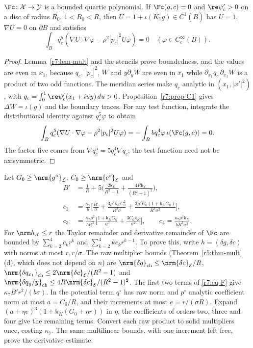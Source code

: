 \begin{lemma}\label{r7:lem-F}
$\Fc\colon\mathcal X\to\mathcal Y$ is a bounded quartic polynomial. If $\Fc(g,c)=0$ and $\re\psi'_c>0$ on a disc of radius $R_0$, $1<R_0<R$, then $U=1+\iota(K_7g)\in C^1(\overline B)$ has $U=1$, $\nabla U=0$ on $\partial B$ and satisfies
\[
\int_Bq_c^5(\nabla U\cdot\nabla\varphi-\rho^2|p_c|^2U\varphi)=0\quad(\varphi\in C_c^\infty(B)).
\]
\end{lemma}
\begin{proof}
Lemma~\ref{r7:lem-mult} and the stencils prove boundedness, and the values are even in $x_1$, because $q_c$, $|p_c|^2$, $W$ and $y\partial_yW$ are even in $x_1$ while $\partial_{x_1}q_c\,\partial_{x_1}W$ is a product of two odd functions. The meridian series make $q_c$ analytic in $(x_1,|x'|^2)$, with $q_c=\int_0^1\re\psi'_c(x_1+iuy)\,du>0$. Proposition~\ref{r7:prop-C1} gives $\Delta W=\iota(g)$ and the boundary traces. For any test function, integrate the distributional identity against $q_c^5\varphi$ to obtain
\[
\int_Bq_c^5(\nabla U\cdot\nabla\varphi-\rho^2|p_c|^2U\varphi)
=-\int_B bq_c^4\varphi\,\iota(\Fc(g,c))=0.
\]
The factor five comes from $\nabla q_c^5=5q_c^4\nabla q_c$; the test function need not be axisymmetric.
\end{proof}

Let $G_0\geq\nrm{g^\circ}_{\mathcal L}$, $C_0\geq\nrm{c^\circ}_{\mathcal E}$ and
\begin{align*}
B'&=\frac1R+5\Big(\frac{2\mathsf k_D}{R^2-1}+\frac{4R\mathsf k_Y}{(R^2-1)^2}\Big),\\
c_2&=\frac{\kappa_7}b\Big[\frac{B'}\sigma+\frac{3\rho^2\mathsf k_KC_0^2}{R^3\sigma}+\frac{3\rho^2C_0(1+\mathsf k_KG_0)}{R^3\sigma^2}\Big],\\
c_3&=\frac{\kappa_7\rho^2}{bR^3}\Big[\frac{1+\mathsf k_KG_0}{\sigma^3}+\frac{3C_0\mathsf k_K}{\sigma^2}\Big],\qquad
c_4=\frac{\kappa_7\rho^2\mathsf k_K}{bR^3\sigma^3}.
\end{align*}
For $\nrm h_{\mathcal X}\leq r$ the Taylor remainder and derivative remainder of $\Fc$ are bounded by $\sum_{k=2}^4c_kr^k$ and $\sum_{k=2}^4kc_kr^{k-1}$. To prove this, write $h=(\delta g,\delta c)$ with norms at most $r,r/\sigma$. The raw multiplier bounds (Theorem~\ref{r5:thm-mult}(d), which does not depend on $n$) are $\nrm{\delta q}_{\mathrm{ch}}\leq\nrm{\delta c}_{\mathcal E}/R$, $\nrm{\delta q_{x_1}}_{\mathrm{ch}}\leq2\nrm{\delta c}_{\mathcal E}/(R^2-1)$ and $\nrm{\delta q_y/y}_{\mathrm{ch}}\leq4R\nrm{\delta c}_{\mathcal E}/(R^2-1)^2$. The first two terms of \eqref{r7:eq-F} give $\kappa_7B'r^2/(b\sigma)$. In the potential term $q^\circ$ has raw norm and $p^\circ$ analytic coefficient norm at most $a=C_0/R$, and their increments at most $e=r/(\sigma R)$. Expand $(a+\eta e)^3(1+\mathsf k_K(G_0+\eta r))$ in $\eta$; the coefficients of orders two, three and four give the remaining terms. Convert each raw product to solid multipliers once, costing $\kappa_7$. The same multilinear bounds, with one increment left free, prove the derivative estimate.

